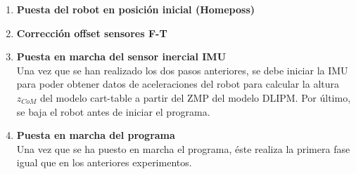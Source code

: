 \begin{enumerate}
\item \textbf{Puesta del robot en posición inicial (Homeposs)}\\

\item \textbf{Corrección offset sensores F-T} 

\item \textbf{Puesta en marcha del sensor inercial IMU}\\ Una vez que se han realizado los dos pasos anteriores, se debe iniciar la IMU para poder obtener datos de aceleraciones del robot para calcular la altura $z_{CoM}$ del modelo cart-table a partir del ZMP del modelo DLIPM. Por último, se baja el robot antes de iniciar el programa.

\item \textbf{Puesta en marcha del programa}\\ Una vez que se ha puesto en marcha el programa, éste realiza la primera fase igual que en los anteriores experimentos. 
\end{enumerate}




\afterpage{\null\newpage}
\newpage
